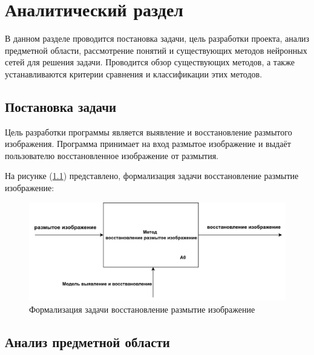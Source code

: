 \chapter{Аналитический раздел}

В данном разделе проводится постановка задачи, цель разработки проекта, анализ предметной области, рассмотрение понятий и существующих методов нейронных сетей для решения задачи. Проводится обзор существующих методов, а также устанавливаются критерии сравнения и классификации этих методов.

\section{Постановка задачи}

Цель разработки программы является выявление и восстановление размытого изображения. Программа принимает на вход размытое изображение и выдаёт пользователю восстановленное изображение от размытия.

На рисунке (\ref{fig:method-desc}) представлено, формализация задачи восстановление размытие изображение: 
\begin{figure}[H]
	\centering
	\includegraphics[width=1\linewidth]{assets/idef0.png}
	\caption{Формализация задачи восстановление размытие изображение}
	\label{fig:method-desc}
\end{figure}

\section{Анализ предметной области}



